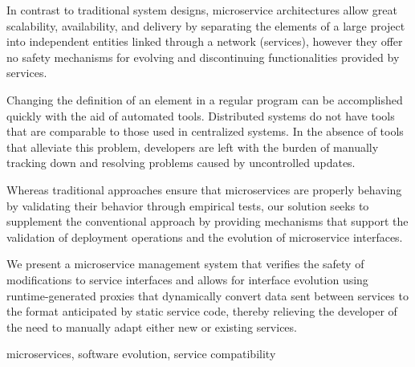 
%

In contrast to traditional system designs, microservice architectures allow great
scalability, availability, and delivery by separating the elements of a large project into independent entities linked through a network (services), however they offer no
safety mechanisms for evolving and discontinuing functionalities provided by services.

Changing the definition of an element in a regular program can be accomplished quickly with the aid of automated tools.
Distributed systems do not have tools that are comparable to those used in centralized systems.
In the absence of tools that alleviate this problem,
developers are left with the burden of manually tracking down and resolving problems caused by uncontrolled updates.

Whereas traditional approaches ensure that microservices are properly behaving by validating their behavior through empirical tests,
our solution seeks to supplement the conventional approach by providing mechanisms that support the validation of deployment operations and the evolution of microservice interfaces.

We present a microservice management system that verifies the safety of modifications to service interfaces
and allows for interface evolution using runtime-generated proxies that dynamically convert data sent between services to the format anticipated by static service code,
thereby relieving the developer of the need to manually adapt either new or existing services.

\begin{keywords}
    microservices, software evolution, service compatibility
\end{keywords} 
